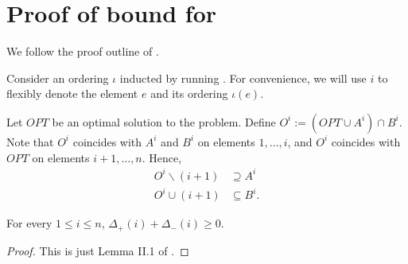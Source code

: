 \section{Proof of bound for \hogwild{}}
\label{app:proofhogwild}


We follow the proof outline of \cite{buchbinder2012}.

Consider an ordering $\iota$ inducted by running \hogwild{}.
For convenience, we will use $i$ to flexibly denote the element $e$ and its ordering $\iota(e)$.

Let $OPT$ be an optimal solution to the problem.
Define $O^i := (OPT \cup A^i) \cap B^i$.
Note that $O^i$ coincides with $A^i$ and $B^i$ on elements $1,\dots,i$, and $O^i$ coincides with $OPT$ on elements $i+1,\dots, n$.
Hence,
\begin{align*}
O^i \backslash (i+1) &\supseteq A^i \\
O^i \cup (i+1) &\subseteq B^i.
\end{align*}

\begin{lem}\label{lem:positivesum} For every $1 \leq i \leq n$, $\Delta_+(i) + \Delta_-(i) \geq 0$.
\end{lem}
\begin{proof} This is just Lemma II.1 of \cite{buchbinder2012}.
\end{proof}

